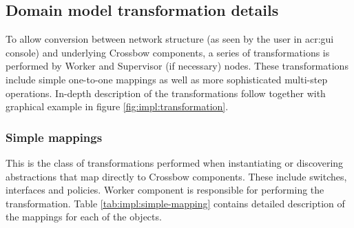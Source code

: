 \documentclass[11pt]{book}
\begin{document}
			\noindent
			\begin{minipage}{\textwidth}
				
			\end{minipage}


      \subsection{Domain model transformation details}
      \label{sec:impl:model}

        To allow conversion between network structure (as seen by the user in \gls{acr:gui} console) and underlying
        Crossbow components, a series of transformations is performed by Worker and Supervisor (if necessary) nodes.
        These transformations include simple one-to-one mappings as well as more sophisticated multi-step operations.
        In-depth description of the transformations follow together with graphical example in figure
        \ref{fig:impl:transformation}.


        \subsubsection{Simple mappings}

          This is the class of transformations performed when instantiating or discovering abstractions that map
          directly to Crossbow components. These include switches, interfaces and policies. Worker component is
          responsible for performing the transformation. Table \ref{tab:impl:simple-mapping} contains detailed
          description of the mappings for each of the objects.
\end{document}
